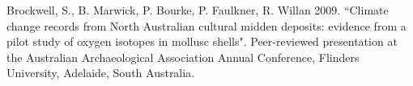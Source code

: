 \ind Brockwell, S., B. Marwick, P. Bourke, P. Faulkner, R. Willan 2009. ``Climate change records from North Australian cultural midden deposits: evidence from a pilot study of oxygen isotopes in mollusc shells". Peer-reviewed presentation  at the Australian Archaeological Association Annual Conference, Flinders University, Adelaide, South Australia.






 \bigskip



